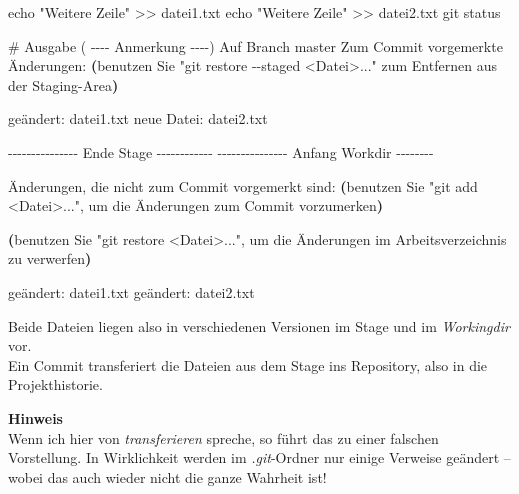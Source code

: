 \documentclass[
  letterpaper,
  DIV=11]{scrreprt}
\newenvironment{Shaded}{\begin{snugshade}}{\end{snugshade}}
\newcommand{\AttributeTok}[1]{\textcolor[rgb]{0.40,0.45,0.13}{#1}}
\newcommand{\BuiltInTok}[1]{\textcolor[rgb]{0.00,0.23,0.31}{#1}}
\newcommand{\CommentTok}[1]{\textcolor[rgb]{0.37,0.37,0.37}{#1}}
\newcommand{\ExtensionTok}[1]{\textcolor[rgb]{0.00,0.23,0.31}{#1}}
\newcommand{\FunctionTok}[1]{\textcolor[rgb]{0.28,0.35,0.67}{#1}}
\newcommand{\KeywordTok}[1]{\textcolor[rgb]{0.00,0.23,0.31}{\textbf{#1}}}
\newcommand{\NormalTok}[1]{\textcolor[rgb]{0.00,0.23,0.31}{#1}}
\newcommand{\OperatorTok}[1]{\textcolor[rgb]{0.37,0.37,0.37}{#1}}
\newcommand{\StringTok}[1]{\textcolor[rgb]{0.13,0.47,0.30}{#1}}
\newcommand{\work}{\textit{Workingdir}\xspace}
\begin{document}
\begin{Shaded}
\begin{Highlighting}[]
\BuiltInTok{echo} \StringTok{"Weitere Zeile"} \OperatorTok{\textgreater{}\textgreater{}}\NormalTok{ datei1.txt  }
\BuiltInTok{echo} \StringTok{"Weitere Zeile"} \OperatorTok{\textgreater{}\textgreater{}}\NormalTok{ datei2.txt }
\FunctionTok{git}\NormalTok{ status }

\CommentTok{\# Ausgabe ( {-}{-}{-}{-} Anmerkung {-}{-}{-}{-})}
\ExtensionTok{Auf}\NormalTok{ Branch master}
\ExtensionTok{Zum}\NormalTok{ Commit vorgemerkte Änderungen:}
  \KeywordTok{(}\ExtensionTok{benutzen}\NormalTok{ Sie }\StringTok{"git restore {-}{-}staged \textless{}Datei\textgreater{}..."}  
   \ExtensionTok{zum}\NormalTok{ Entfernen aus der Staging{-}Area}\KeywordTok{)}
    
    \ExtensionTok{geändert:}\NormalTok{       datei1.txt}
    \ExtensionTok{neue}\NormalTok{ Datei:     datei2.txt}

\ExtensionTok{{-}{-}{-}{-}{-}{-}{-}{-}{-}{-}{-}{-}{-}{-}{-}}\NormalTok{ Ende Stage }\AttributeTok{{-}{-}{-}{-}{-}{-}{-}{-}{-}{-}{-}{-}}
\ExtensionTok{{-}{-}{-}{-}{-}{-}{-}{-}{-}{-}{-}{-}{-}{-}{-}}\NormalTok{ Anfang Workdir }\AttributeTok{{-}{-}{-}{-}{-}{-}{-}{-}}

\ExtensionTok{Änderungen,}\NormalTok{ die nicht zum Commit vorgemerkt sind:}
  \KeywordTok{(}\ExtensionTok{benutzen}\NormalTok{ Sie }\StringTok{"git add \textless{}Datei\textgreater{}..."}\NormalTok{, um die Änderungen }
   \ExtensionTok{zum}\NormalTok{ Commit vorzumerken}\KeywordTok{)}
  
  \KeywordTok{(}\ExtensionTok{benutzen}\NormalTok{ Sie }\StringTok{"git restore \textless{}Datei\textgreater{}..."}\NormalTok{, }
   \ExtensionTok{um}\NormalTok{ die Änderungen im Arbeitsverzeichnis zu verwerfen}\KeywordTok{)}

    \ExtensionTok{geändert:}\NormalTok{       datei1.txt}
    \ExtensionTok{geändert:}\NormalTok{       datei2.txt}
\end{Highlighting}
\end{Shaded}

Beide Dateien liegen also in verschiedenen Versionen im Stage und im
\work vor.\\
Ein Commit transferiert die Dateien aus dem Stage ins Repository, also
in die Projekthistorie.

\samplestart

\textbf{Hinweis}\\
Wenn ich hier von \emph{transferieren} spreche, so führt das zu einer
falschen Vorstellung. In Wirklichkeit werden im \emph{.git}-Ordner nur
einige Verweise geändert -- wobei das auch wieder nicht die ganze
Wahrheit ist! \sampleend
\end{document}
